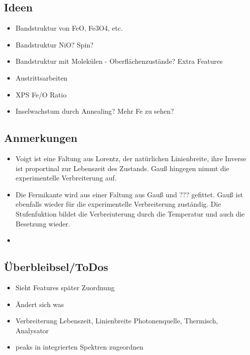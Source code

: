     \subsection{Ideen}
    \begin{itemize}
        \item Bandstruktur von FeO, Fe3O4, etc.
        \item Bandstruktur NiO? Spin?
        \item Bandstruktur mit Molekülen - Oberflächenzustände? Extra Features
        \item Austrittsarbeiten
        \item XPS Fe/O Ratio 
        \item Inselwachstum durch Annealing? Mehr Fe zu sehen?
    \end{itemize}

    \subsection{Anmerkungen}
    \begin{itemize}
        \item Voigt ist eine Faltung aus Lorentz, der natürlichen Linienbreite, ihre Inverse ist proportinal zur Lebenszeit des Zustands. Gauß hingegen nimmt die experimentelle Verbreiterung auf.
        \item Die Fermikante wird aus einer Faltung aus Gauß und ??? gefittet. Gauß ist ebenfalls wieder für die experimentelle Verbreiterung zuständig. Die Stufenfuktion bildet die Verbreiuterung durch die Temperatur und auch die Besetzung wieder.
        \item 
    \end{itemize}

    \subsection{Überbleibsel/ToDos}
    \begin{itemize}
        \item Sieht Features später Zuordnung
        \item Ändert sich was
        \item Verbreiterung Lebenszeit, Linienbreite Photonenquelle, Thermisch, Analysator
        \item peaks in integrierten Spektren zugeordnen
    \end{itemize}

